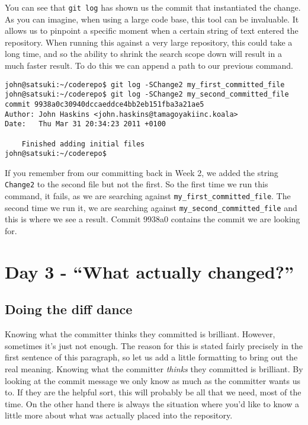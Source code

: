 You can see that \texttt{git log} has shown us the commit that instantiated the change.  As you can imagine, when using a large code base, this tool can be invaluable.  It allows us to pinpoint a specific moment when a certain string of text entered the repository.  When running this against a very large repository, this could take a long time, and so the ability to shrink the search scope down will result in a much faster result.  To do this we can append a path to our previous command.  

\begin{Verbatim}[frame=leftline,framerule=1mm,fontsize=\relsize{-3}] 
john@satsuki:~/coderepo$ git log -SChange2 my_first_committed_file
john@satsuki:~/coderepo$ git log -SChange2 my_second_committed_file
commit 9938a0c30940dccaeddce4bb2eb151fba3a21ae5
Author: John Haskins <john.haskins@tamagoyakiinc.koala>
Date:   Thu Mar 31 20:34:23 2011 +0100

    Finished adding initial files
john@satsuki:~/coderepo$ 
\end{Verbatim}

If you remember from our committing back in Week 2, we added the string \texttt{Change2} to the second file but not the first.  So the first time we run this command, it fails, as we are searching against \texttt{my\_first\_committed\_file}.  The second time we run it, we are searching against \texttt{my\_second\_committed\_file} and this is where we see a result.  Commit 9938a0 contains the commit we are looking for.

\section{Day 3 - ``What actually changed?''}
\subsection{Doing the diff dance}

Knowing what the committer thinks they committed is brilliant.  However, sometimes it's just not enough.  The reason for this is stated fairly precisely in the first sentence of this paragraph, so let us add a little formatting to bring out the real meaning.  Knowing what the committer \emph{thinks} they committed is brilliant.  By looking at the commit message we only know as much as the committer wants us to.  If they are the helpful sort, this will probably be all that we need, most of the time.  On the other hand there is always the situation where you'd like to know a little more about what was actually placed into the repository.

